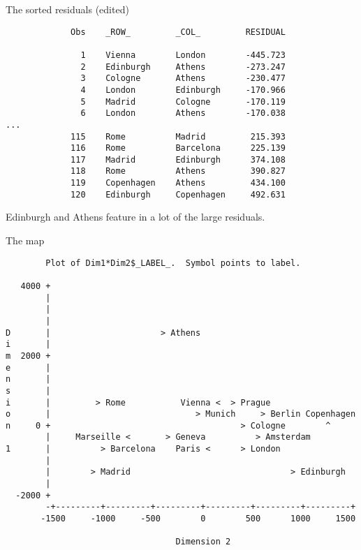\documentclass[pdf]{prosper}
\begin{document}
\begin{slide}{The sorted residuals (edited)}

{\scriptsize
\begin{verbatim}
             Obs    _ROW_         _COL_         RESIDUAL

               1    Vienna        London        -445.723
               2    Edinburgh     Athens        -273.247
               3    Cologne       Athens        -230.477
               4    London        Edinburgh     -170.966
               5    Madrid        Cologne       -170.119
               6    London        Athens        -170.038
...
             115    Rome          Madrid         215.393
             116    Rome          Barcelona      225.139
             117    Madrid        Edinburgh      374.108
             118    Rome          Athens         390.827
             119    Copenhagen    Athens         434.100
             120    Edinburgh     Copenhagen     492.631
\end{verbatim}
}
Edinburgh and Athens feature in a lot of the large residuals.
  
\end{slide}

\begin{slide}{The map}

{\scriptsize
\begin{verbatim}
        Plot of Dim1*Dim2$_LABEL_.  Symbol points to label.

   4000 +
        |
        |
        |
D       |                      > Athens
i       |
m  2000 +
e       |
n       |
s       |
i       |         > Rome           Vienna <  > Prague
o       |                             > Munich     > Berlin Copenhagen
n     0 +                                      > Cologne        ^
        |     Marseille <       > Geneva          > Amsterdam
1       |          > Barcelona    Paris <      > London
        |
        |        > Madrid                                > Edinburgh
        |
  -2000 +
        -+---------+---------+---------+---------+---------+---------+
       -1500     -1000     -500        0        500      1000     1500

                                  Dimension 2

\end{verbatim}
}

  
\end{slide}
\end{document}
